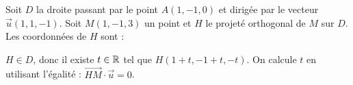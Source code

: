 \begin{question} 
Soit $D$ la droite passant par le point $A(1,-1,0)$ et dirigée par le vecteur $\vec{u}(1,1,-1)$. Soit $M(1,-1,3)$ un point et $H$ le projeté orthogonal de $M$ sur $D$. Les coordonnées de $H$ sont : 
\begin{answers}


 
    
     
   
\end{answers}
\begin{explanations}
$H\in D$, donc il existe $t \in \mathbb{R}$ tel que $H(1+t,-1+t,-t)$. On calcule $t$ en utilisant l'égalité : $\overrightarrow{HM} \cdot \vec{u} = 0$.
\end{explanations}

\end{question}


